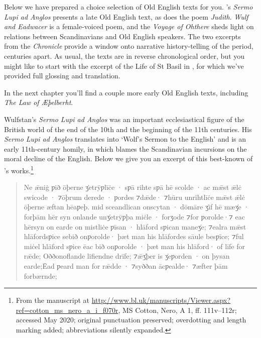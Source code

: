 Below we have prepared a choice selection of Old English texts for you. 's \textit{Sermo Lupi ad Anglos} presents a late Old English text, as does the poem \emph{Judith}. \emph{Wulf and Eadwacer} is a female-voiced poem, and the \emph{Voyage of Ohthere} sheds light on relations between Scandinavians and Old English speakers. The two excerpts from the \emph{Chronicle} provide a window onto narrative history-telling of the period, centuries apart. As usual, the texts are in reverse chronological order, but you might like to start with the excerpt of the Life of St Basil in , for which we've provided full glossing and translation.

In the next chapter you'll find a couple more early Old English texts, including \textit{The Law of Æþelberht}.


\begin{texts}{Wulfstan's \textit{Sermo Lupi ad Anglos}}
 was an important ecclesiastical figure of the British world of the end of the 10th and the beginning of the 11th centuries. His \textit{Sermo Lupi ad Anglos} translates into `Wolf's Sermon to the English' and is an early 11th-century homily, in which  blames the Scandinavian incursions on the moral decline of the English. Below we give you an excerpt of this best-known of 's works.\footnote{From the manuscript at \url{http://www.bl.uk/manuscripts/Viewer.aspx?ref=cotton_ms_nero_a_i_f070r}, MS Cotton, Nero, A 1, ff. 111v--112r; accessed May 2020; original punctuation preserved; overdotting and length marking added; abbreviations silently expanded.}

\begin{quote}
    \internallinenumbers*{}
    Ne ǣniġ ƿið ōþerne \.{ʒ}etrȳƿlīċe · sƿā rihte sƿā hē scolde · ac mǣst ǣlċ swicode · ⁊ōþrum derede · ƿordes ⁊dǣde· ⁊hūru unrihtlīċe mǣst ǣlċ ōþerne æftan hēaƿeþ. mid sceandlican onscytan · dōmāre \.{ʒ}if hē mæ\.{ʒ}e · forþām hēr syn onlande un\.{ʒ}etrȳƿþa miċle · forʒode ⁊for ƿorolde·⁊ eac hērsyn on earde on mistliċe ƿīsan · hlāford sƿican mane\.{ʒ}e; ⁊ealra mǣst hlāfordsƿice sebið onƿorolde· þæt man his hlāfordes sāule besƿīce; ⁊ful miċel hlāford sƿice ēac bið onƿorolde · þæt man his hlāford· of līfe for rǣde; Oððonoflande lifiendne drīfe; ⁊ǣ\.{ʒ}þer is \.{ʒ}eƿorden · on þysan earde;Ēad ƿeard man for rǣdde · ⁊syððan ācƿealde· ⁊æfter þām forbærnde;
\end{quote}


\end{texts}

